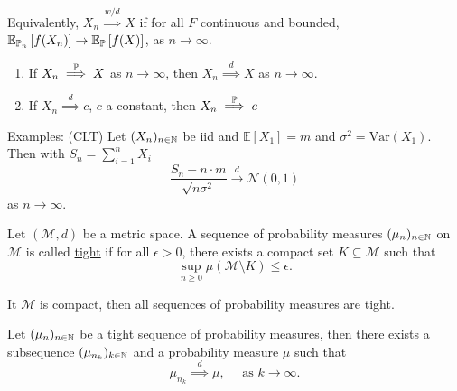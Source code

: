 \documentclass{article}
\begin{document}
\begin{remark}
	Equivalently, $ X_{n} \stackrel{w/d}{\implies}X$ if for all $ F$ continuous and bounded, $  \mathbb{E}_{\mathbb{P}_{n}}\left[ f(X_{n}) \right]\to \mathbb{E}_{\mathbb{P}}\left[ f(X) \right]$, as $ n\to \infty$.
\end{remark}

\begin{boxprop}\label{prop: conv in prob conv in dist}
\begin{enumerate}
	\item If $ X_{n}\stackrel{\mathbb{P}}{\implies} X$ as $ n\to \infty$, then $ X_{n}\stackrel{d}{\implies} X$ as $ n\to \infty$. 
	\item If $  X_{n}\stackrel{d}{\implies} c$, $ c$ a constant, then $  X_{n}\stackrel{\mathbb{P}}{\implies} c$
\end{enumerate}

\end{boxprop}


\begin{examplesblock}{Examples: (CLT)}\label{examples: 8}
	Let $(X_{n})_{n\in \mathbb{N}}$ be iid and $ \mathbb{E}\left[ X_{1} \right] = m$ and $ \sigma^{2} = \text{Var}(X_{1})$. Then with $ S_{n} =\displaystyle\sum^{n}_{i=1}X_{i} $
	\[
		\frac{S_{n}-n\cdot m}{\sqrt{n\sigma^{2}}} \stackrel{d}{\longrightarrow} \mathcal{N}(0,1)
	\]
	as $ n\to \infty$.
\end{examplesblock}

\begin{boxdef}[Tightness]\label{def: waek conv tightness}
	Let $ ( \mathcal{M}, d)$ be a metric space. A sequence of probability measures $ (\mu_{n})_{n\in \mathbb{N}}$ on $ \mathcal{M}$ is called \underline{tight} if for all $ \epsilon>0$, there exists a compact set $ K\subseteq \mathcal{M}$ such that 
\[
 \displaystyle\sup_{n\geq 0}\mu( \mathcal{M}\setminus K)\leq \epsilon.
\]
\end{boxdef}


\begin{remark}
    It $ \mathcal{M}$ is compact, then all sequences of probability measures are tight. 
\end{remark}

\begin{theorem}[Prohorov]\label{thm: prohorov}
Let $ (\mu_{n})_{n\in\mathbb{N}}$ be a tight sequence of probability measures, then there exists a subsequence $ (\mu_{n_{k}})_{k\in \mathbb{N}}$ and a probability measure $ \mu$ such that 
\[
	\mu_{n_{k}} \stackrel{d}{\implies} \mu, \quad \text{ as }k\to \infty.
\]
\end{theorem}
\end{document}
